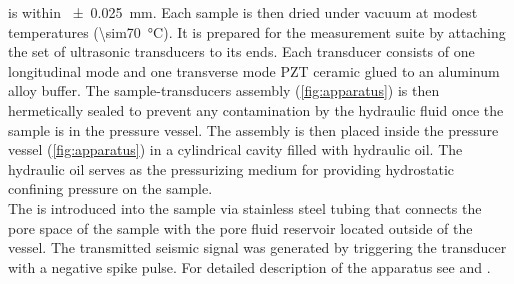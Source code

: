 is within \SI{\pm0.025}{\mm}. Each sample is then dried under vacuum at modest
temperatures (\SI{\sim70}{\degreeCelsius}). It is prepared for the measurement
suite by attaching the set of ultrasonic transducers to its ends. Each
transducer consists of one longitudinal mode and one transverse mode PZT ceramic
glued to an aluminum alloy buffer. The sample-transducers assembly
(\cref{fig:apparatus}) is then hermetically sealed to prevent any contamination
by the hydraulic fluid once the sample is in the pressure vessel. The assembly
is then placed inside the pressure vessel (\cref{fig:apparatus}) in a
cylindrical cavity filled with hydraulic oil. The hydraulic oil serves as the
pressurizing medium for providing hydrostatic confining pressure on the
sample.\\
The  is introduced into the sample via stainless steel tubing that
connects the pore space of the sample with the pore fluid reservoir located
outside of the vessel. The transmitted seismic signal was generated by
triggering the transducer with a negative spike pulse. For detailed description
of the apparatus see \citet{Njiekak2013} and \citet{Yam2011}.

